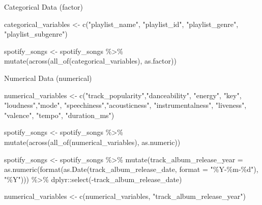 \documentclass[
]{article}
\newenvironment{Shaded}{\begin{snugshade}}{\end{snugshade}}
\newcommand{\AttributeTok}[1]{\textcolor[rgb]{0.77,0.63,0.00}{#1}}
\newcommand{\FunctionTok}[1]{\textcolor[rgb]{0.00,0.00,0.00}{#1}}
\newcommand{\NormalTok}[1]{#1}
\newcommand{\OtherTok}[1]{\textcolor[rgb]{0.56,0.35,0.01}{#1}}
\newcommand{\SpecialCharTok}[1]{\textcolor[rgb]{0.00,0.00,0.00}{#1}}
\newcommand{\StringTok}[1]{\textcolor[rgb]{0.31,0.60,0.02}{#1}}
\begin{document}
Categorical Data (factor)

\begin{Shaded}
\begin{Highlighting}[]
\NormalTok{categorical\_variables }\OtherTok{\textless{}{-}} \FunctionTok{c}\NormalTok{(}\StringTok{"playlist\_name"}\NormalTok{, }\StringTok{"playlist\_id"}\NormalTok{, }\StringTok{"playlist\_genre"}\NormalTok{, }\StringTok{"playlist\_subgenre"}\NormalTok{)}

\NormalTok{spotify\_songs }\OtherTok{\textless{}{-}}\NormalTok{ spotify\_songs }\SpecialCharTok{\%\textgreater{}\%}
  \FunctionTok{mutate}\NormalTok{(}\FunctionTok{across}\NormalTok{(}\FunctionTok{all\_of}\NormalTok{(categorical\_variables), as.factor)) }
\end{Highlighting}
\end{Shaded}

Numerical Data (numerical)

\begin{Shaded}
\begin{Highlighting}[]
\NormalTok{numerical\_variables }\OtherTok{\textless{}{-}} \FunctionTok{c}\NormalTok{(}\StringTok{"track\_popularity"}\NormalTok{,}\StringTok{"danceability"}\NormalTok{, }\StringTok{"energy"}\NormalTok{, }\StringTok{"key"}\NormalTok{, }
                           \StringTok{"loudness"}\NormalTok{,}\StringTok{"mode"}\NormalTok{, }\StringTok{"speechiness"}\NormalTok{,}\StringTok{"acousticness"}\NormalTok{,}
                           \StringTok{"instrumentalness"}\NormalTok{, }\StringTok{"liveness"}\NormalTok{, }\StringTok{"valence"}\NormalTok{, }
                           \StringTok{"tempo"}\NormalTok{, }\StringTok{"duration\_ms"}\NormalTok{)             }

\NormalTok{spotify\_songs }\OtherTok{\textless{}{-}}\NormalTok{ spotify\_songs }\SpecialCharTok{\%\textgreater{}\%}
  \FunctionTok{mutate}\NormalTok{(}\FunctionTok{across}\NormalTok{(}\FunctionTok{all\_of}\NormalTok{(numerical\_variables), as.numeric))}

\NormalTok{spotify\_songs }\OtherTok{\textless{}{-}}\NormalTok{ spotify\_songs }\SpecialCharTok{\%\textgreater{}\%}
  \FunctionTok{mutate}\NormalTok{(}\AttributeTok{track\_album\_release\_year =} \FunctionTok{as.numeric}\NormalTok{(}\FunctionTok{format}\NormalTok{(}\FunctionTok{as.Date}\NormalTok{(track\_album\_release\_date, }\AttributeTok{format =} \StringTok{"\%Y{-}\%m{-}\%d"}\NormalTok{), }\StringTok{"\%Y"}\NormalTok{))) }\SpecialCharTok{\%\textgreater{}\%}
\NormalTok{  dplyr}\SpecialCharTok{::}\FunctionTok{select}\NormalTok{(}\SpecialCharTok{{-}}\NormalTok{track\_album\_release\_date)}

\NormalTok{numerical\_variables }\OtherTok{\textless{}{-}} \FunctionTok{c}\NormalTok{(numerical\_variables, }\StringTok{"track\_album\_release\_year"}\NormalTok{)}
\end{Highlighting}
\end{Shaded}
\end{document}
